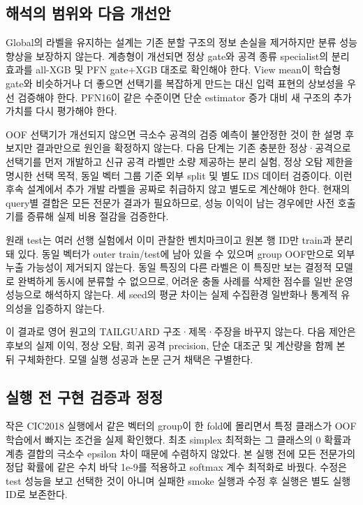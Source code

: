 \subsection{해석의 범위와 다음 개선안}
Global의 라벨을 유지하는 설계는 기존 분할 구조의 정보 손실을 제거하지만 분류 성능 향상을 보장하지 않는다. 계층형이 개선되면 정상 gate와 공격 종류 specialist의 분리 효과를 all-XGB 및 PFN gate+\allowbreak{}XGB 대조로 확인해야 한다. View mean이 학습형 gate와 비슷하거나 더 좋으면 선택기를 복잡하게 만드는 대신 입력 표현의 상보성을 우선 검증해야 한다. PFN16이 같은 수준이면 단순 estimator 증가 대비 새 구조의 추가 가치를 다시 평가해야 한다.

OOF 선택기가 개선되지 않으면 극소수 공격의 검증 예측이 불안정한 것이 한 설명 후보지만 결과만으로 원인을 확정하지 않는다. 다음 단계는 기존 충분한 정상·공격으로 선택기를 먼저 개발하고 신규 공격 라벨만 소량 제공하는 분리 실험, 정상 오탐 제한을 명시한 선택 목적, 동일 벡터 그룹 기준 외부 split 및 별도 IDS 데이터 검증이다. 이런 후속 설계에서 추가 개발 라벨을 공짜로 취급하지 않고 별도로 계산해야 한다. 현재의 query별 결합은 모든 전문가 결과가 필요하므로, 성능 이익이 남는 경우에만 사전 호출기를 증류해 실제 비용 절감을 검증한다.

원래 test는 여러 선행 실험에서 이미 관찰한 벤치마크이고 원본 행 ID만 train과 분리돼 있다. 동일 벡터가 outer train/\allowbreak{}test에 남아 있을 수 있으며 group OOF만으로 외부 누출 가능성이 제거되지 않는다. 동일 특징의 다른 라벨은 이 특징만 보는 결정적 모델로 완벽하게 동시에 분류할 수 없으므로, 어려운 충돌 사례를 삭제한 점수를 일반 운영 성능으로 해석하지 않는다. 세 seed의 평균 차이는 실제 수집환경 일반화나 통계적 유의성을 입증하지 않는다.

이 결과로 영어 원고의 TAILGUARD 구조·제목·주장을 바꾸지 않는다. 다음 제안은 후보의 실제 이익, 정상 오탐, 희귀 공격 precision, 단순 대조군 및 계산량을 함께 본 뒤 구체화한다. 모델 실행 성공과 논문 근거 채택은 구별한다.

\subsection{실행 전 구현 검증과 정정}
작은 CIC2018 실행에서 같은 벡터의 group이 한 fold에 몰리면서 특정 클래스가 OOF 학습에서 빠지는 조건을 실제 확인했다. 최초 simplex 최적화는 그 클래스의 0 확률과 계층 결합의 극소수 epsilon 차이 때문에 수렴하지 않았다. 본 실행 전에 모든 전문가의 정답 확률에 같은 수치 바닥 1e-9를 적용하고 softmax 계수 최적화로 바꿨다. 수정은 test 성능을 보고 선택한 것이 아니며 실패한 smoke 실행과 수정 후 실행은 별도 실행 ID로 보존한다.

